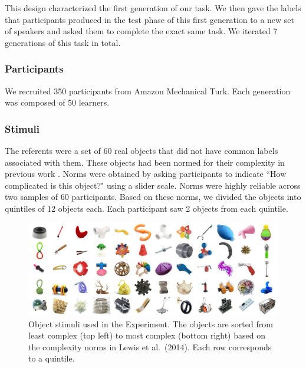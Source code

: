 This design characterized the first generation of our task. We then gave the labels that participants produced in the test phase of this first generation to a new set of speakers and asked them to complete the exact same task. We iterated 7 generations of this task in total.


\subsubsection{Participants} 

We recruited 350 participants from Amazon Mechanical Turk. Each generation was composed of 50 learners.

\subsubsection{Stimuli}

The referents were a set of 60 real objects that did not have common labels associated with them. These objects had been normed for their complexity in previous work \cite[Figure\ 1]{lewisstructure2014}. Norms were obtained by asking participants to indicate ``How complicated is this object?" using a slider scale. Norms were highly reliable across two samples of 60 participants. Based on these norms, we divided the objects into quintiles of 12 objects each. Each participant saw 2 objects from each quintile. 

\begin{figure}[b!]
\begin{center}
\includegraphics[width = 1\linewidth]{figs/realobjs.pdf}
\end{center}
\vspace{-.24em}
\caption{Object stimuli used in the Experiment. The objects are sorted from least complex (top left) to most complex (bottom right) based on the complexity norms in Lewis et al.\ (2014). Each row corresponds to a quintile.}
\label{fig:objs}
\vspace{-1em}
\end{figure}


